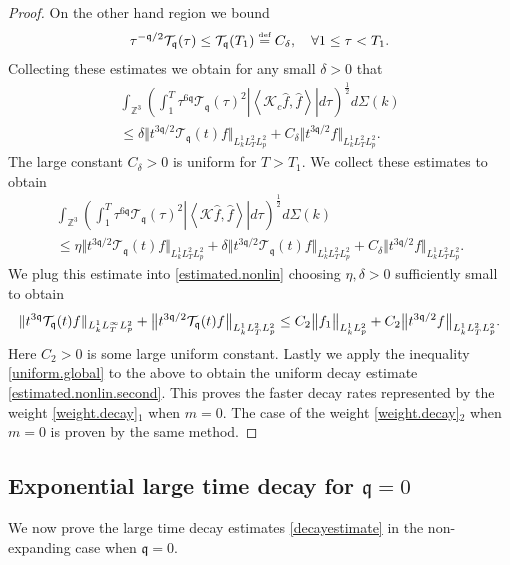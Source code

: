 \documentclass[reqno]{amsart}
\newcommand{\eqdef }{\overset{\mbox{\tiny{def}}}{=}}
\newcommand{\pv}{p}
\def\norm#1{\big\Vert#1\big\Vert}
\newcommand{\irnp}[2]{\left\langle {#1},{#2} \right\rangle}
\newcommand{\qq}{\mathfrak{q}}
\newcommand{\tTq}{t^{3\qq}}
\newcommand{\compK}{\mathcal{K}}
\newcommand{\Z}{\mathbb{Z}}
\newcommand{\tw}{\mathcal{T}_{\qq}}
\theoremstyle{definition}
\numberwithin{equation}{section}
\numberwithin{theorem}{section}
\begin{document}
\begin{proof}
On the other hand region we bound 
\begin{align*}
   \tau^{-\qq/2}  \tw(\tau)
    \leq   \tw(T_1)\eqdef C_\delta, \quad \forall 1\leq \tau < T_1.
\end{align*}
Collecting these estimates we obtain for any small $\delta>0$ that 
\begin{multline*}
    \int_{\Z^3} 
\left(\int^T_1 \tau^{6\qq} \tw(\tau)^2 \left|\irnp{\compK_c\hat{f}}{\hat{f}}\right|
d\tau \right)^{\frac12}
d\Sigma(k)
\\
\leq 
\delta {\norm{t^{3\qq/2} \tw(t) f}_{L^1_kL^2_TL^2_{\pv}}}
+
C_\delta {\norm{t^{3\qq/2}  f}_{L^1_kL^2_TL^2_{\pv}}}.
\end{multline*}
The large constant $C_\delta>0$ is uniform for $T>T_1$.  We collect these estimates to obtain
\begin{multline*}
    \int_{\Z^3} 
\left(\int^T_1 \tau^{6\qq} \tw(\tau)^2 \left|\irnp{\compK\hat{f}}{\hat{f}}\right|
d\tau \right)^{\frac12}
d\Sigma(k)
\\
\leq 
\eta {\norm{t^{3\qq/2} \tw(t) f}_{L^1_kL^2_TL^2_{\pv}}}
+
\delta {\norm{t^{3\qq/2} \tw(t) f}_{L^1_kL^2_TL^2_{\pv}}}
+
C_\delta {\norm{t^{3\qq/2}  f}_{L^1_kL^2_TL^2_{\pv}}}.
\end{multline*}
We plug this estimate into \eqref{estimated.nonlin}  choosing $\eta, \delta>0$ sufficiently small to obtain
\begin{align}\notag
            {\Vert{\tTq \tw(t) f}\Vert_{L^1_kL^\infty_TL^2_{\pv}}}
+
{\norm{t^{3\qq/2} \tw(t) f}_{L^1_kL^2_TL^2_{\pv}}}
\leq C_2
\norm{ {f}_1}_{L^1_kL^2_{\pv}}
+ C_2
{\norm{t^{3\qq/2}  f}_{L^1_kL^2_TL^2_{\pv}}}.
\end{align}
Here $C_2>0$ is some large uniform constant.  Lastly we apply the inequality \eqref{uniform.global} to the above to obtain the uniform decay estimate \eqref{estimated.nonlin.second}.
This proves the faster decay rates represented by the weight \eqref{weight.decay}$_1$ when $m=0$. The case of the weight \eqref{weight.decay}$_2$ when $m=0$ is proven by the same method.
\end{proof}



\subsection{Exponential large time decay for \texorpdfstring{$\qq =0$}{}} \label{subsexpnonexp}

We now prove the large time decay estimates \eqref{decayestimate} in the non-expanding case when $\qq =0$.
\end{document}
